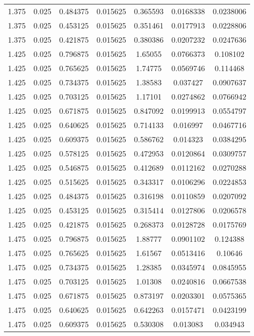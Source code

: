 \begin{flushleft}
\begin{longtable}{ccccccc}
1.375 & 0.025 & 0.484375 & 0.015625 & 0.365593 & 0.0168338 & 0.0238006  \\ 
1.375 & 0.025 & 0.453125 & 0.015625 & 0.351461 & 0.0177913 & 0.0228806  \\ 
1.375 & 0.025 & 0.421875 & 0.015625 & 0.380386 & 0.0207232 & 0.0247636  \\ 
1.425 & 0.025 & 0.796875 & 0.015625 & 1.65055 & 0.0766373 & 0.108102  \\ 
1.425 & 0.025 & 0.765625 & 0.015625 & 1.74775 & 0.0569746 & 0.114468  \\ 
1.425 & 0.025 & 0.734375 & 0.015625 & 1.38583 & 0.037427 & 0.0907637  \\ 
1.425 & 0.025 & 0.703125 & 0.015625 & 1.17101 & 0.0274862 & 0.0766942  \\ 
1.425 & 0.025 & 0.671875 & 0.015625 & 0.847092 & 0.0199913 & 0.0554797  \\ 
1.425 & 0.025 & 0.640625 & 0.015625 & 0.714133 & 0.016997 & 0.0467716  \\ 
1.425 & 0.025 & 0.609375 & 0.015625 & 0.586762 & 0.014323 & 0.0384295  \\ 
1.425 & 0.025 & 0.578125 & 0.015625 & 0.472953 & 0.0120864 & 0.0309757  \\ 
1.425 & 0.025 & 0.546875 & 0.015625 & 0.412689 & 0.0112162 & 0.0270288  \\ 
1.425 & 0.025 & 0.515625 & 0.015625 & 0.343317 & 0.0106296 & 0.0224853  \\ 
1.425 & 0.025 & 0.484375 & 0.015625 & 0.316198 & 0.0110859 & 0.0207092  \\ 
1.425 & 0.025 & 0.453125 & 0.015625 & 0.315414 & 0.0127806 & 0.0206578  \\ 
1.425 & 0.025 & 0.421875 & 0.015625 & 0.268373 & 0.0128728 & 0.0175769  \\ 
1.475 & 0.025 & 0.796875 & 0.015625 & 1.88777 & 0.0901102 & 0.124388  \\ 
1.475 & 0.025 & 0.765625 & 0.015625 & 1.61567 & 0.0513416 & 0.10646  \\ 
1.475 & 0.025 & 0.734375 & 0.015625 & 1.28385 & 0.0345974 & 0.0845955  \\ 
1.475 & 0.025 & 0.703125 & 0.015625 & 1.01308 & 0.0240816 & 0.0667538  \\ 
1.475 & 0.025 & 0.671875 & 0.015625 & 0.873197 & 0.0203301 & 0.0575365  \\ 
1.475 & 0.025 & 0.640625 & 0.015625 & 0.642263 & 0.0157471 & 0.0423199  \\ 
1.475 & 0.025 & 0.609375 & 0.015625 & 0.530308 & 0.013083 & 0.034943  \\ 

\end{longtable}
\end{flushleft}
